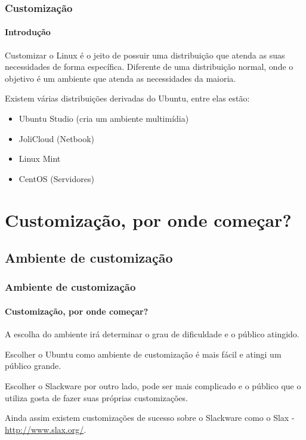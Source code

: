 \begin{frame}\frametitle{Customização}\framesubtitle{Introdução}

Customizar o Linux é o jeito de possuir uma distribuição que atenda as suas necessidades de forma específica.
Diferente de uma distribuição normal, onde o objetivo é um ambiente que atenda as necessidades da maioria.

\medskip

Existem várias distribuições derivadas do Ubuntu, entre elas estão:
\begin{itemize}
	\item Ubuntu Studio (cria um ambiente multimídia)
	\item JoliCloud (Netbook)
	\item Linux Mint
	\item CentOS (Servidores)
\end{itemize}

\end{frame}

\section{Customização, por onde começar?}

\begin{frame}


\end{frame}

\subsection{Ambiente de customização}

\begin{frame}


\end{frame}

\begin{frame}\frametitle{Ambiente de customização}\framesubtitle{Customização, por onde começar?}

A escolha do ambiente irá determinar o grau de dificuldade e o público atingido.

\medskip

Escolher o Ubuntu como ambiente de customização é mais fácil e atingi um público grande.

\medskip

Escolher o Slackware por outro lado, pode ser mais complicado e o público que o utiliza
gosta de fazer suas próprias customizações.

\medskip

Ainda assim existem customizações de sucesso sobre o Slackware como o Slax - \url{http://www.slax.org/}.

\end{frame}

